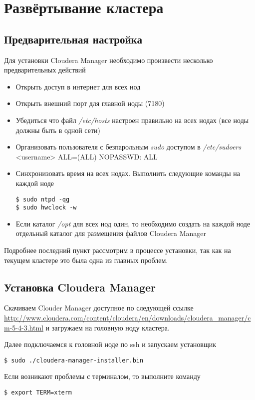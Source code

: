 \chapter{Развёртывание кластера}
\section{Предварительная настройка}
Для установки Cloudera Manager необходимо произвести несколько предварительных действий
\begin{itemize}
    \item Открыть доступ в интернет для всех нод
    \item Открыть внешний порт для главной ноды (7180)
    \item Убедиться что файл \emph{/etc/hosts} настроен правильно на всех нодах
        (все ноды должны быть в одной сети)
    \item Организовать пользователя с безпарольным \emph{sudo} доступом в \emph{/etc/sudoers}\\
        <username> ALL=(ALL) NOPASSWD: ALL
    \item Синхронизовать время на всех нодах. Выполнить следующие команды на каждой ноде
\begin{lstlisting}
$ sudo ntpd -qg
$ sudo hwclock -w
\end{lstlisting}
    \item Если каталог \emph{/opt} для всех нод один, то необходимо создать на каждой ноде отдельный 
        каталог для размещения файлов Cloudera Manager
\end{itemize}
Подробнее последний пункт рассмотрим в процессе установки, так как на текущем кластере это была одна из 
главных проблем.

\newpage

\section{Установка Cloudera Manager}
Скачиваем Clouder Manager доступное по следующей ссылке 
\url{http://www.cloudera.com/content/cloudera/en/downloads/cloudera_manager/cm-5-4-3.html} и 
загружаем на головную ноду кластера.

Далее подключаемся к головной ноде по ssh и запускаем установщик
\begin{lstlisting}
$ sudo ./cloudera-manager-installer.bin
\end{lstlisting}

Если возникают проблемы с терминалом, то выполните команду
\begin{lstlisting}
$ export TERM=xterm
\end{lstlisting}

